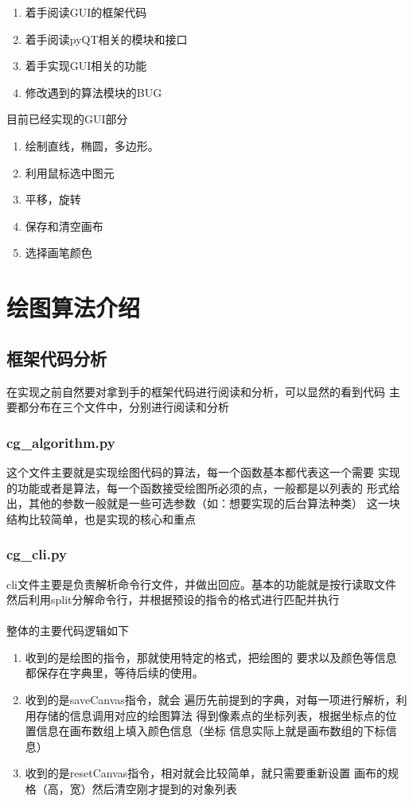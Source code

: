 \documentclass[a4paper,UTF8]{article}
\theoremstyle{definition}
\begin{document}
\begin{enumerate}
    \item 着手阅读GUI的框架代码
    
    \item 着手阅读pyQT相关的模块和接口
    
    \item 着手实现GUI相关的功能
    
    \item 修改遇到的算法模块的BUG
\end{enumerate}

目前已经实现的GUI部分
\begin{enumerate}
    \item 绘制直线，椭圆，多边形。
    
    \item 利用鼠标选中图元
    
    \item 平移，旋转
    
    \item 保存和清空画布
    
    \item 选择画笔颜色
\end{enumerate}


\section{绘图算法介绍}
\subsection{框架代码分析}
在实现之前自然要对拿到手的框架代码进行阅读和分析，可以显然的看到代码
主要都分布在三个文件中，分别进行阅读和分析
\subsubsection{cg\_algorithm.py}
这个文件主要就是实现绘图代码的算法，每一个函数基本都代表这一个需要
实现的功能或者是算法，每一个函数接受绘图所必须的点，一般都是以列表的
形式给出，其他的参数一般就是一些可选参数（如：想要实现的后台算法种类）
这一块结构比较简单，也是实现的核心和重点
\subsubsection{cg\_cli.py}
cli文件主要是负责解析命令行文件，并做出回应。基本的功能就是按行读取文件
然后利用split分解命令行，并根据预设的指令的格式进行匹配并执行\\\\
整体的主要代码逻辑如下
\begin{enumerate}
    \item 收到的是绘图的指令，那就使用特定的格式，把绘图的
    要求以及颜色等信息都保存在字典里，等待后续的使用。
    \item 收到的是saveCanvas指令，就会
    遍历先前提到的字典，对每一项进行解析，利用存储的信息调用对应的绘图算法
    得到像素点的坐标列表，根据坐标点的位置信息在画布数组上填入颜色信息（坐标
    信息实际上就是画布数组的下标信息）
    \item 收到的是resetCanvas指令，相对就会比较简单，就只需要重新设置
    画布的规格（高，宽）然后清空刚才提到的对象列表
\end{enumerate}
\end{document}
